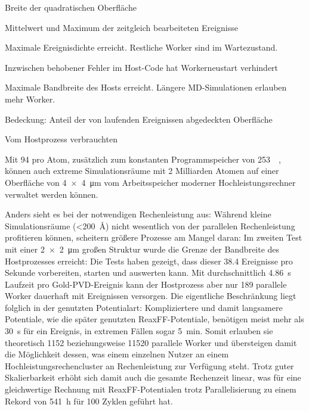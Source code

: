 \begin{table}
\begin{threeparttable}
    \begin{tablenotes}
    \item[2] Breite der quadratischen Oberfläche
    \item[a] Mittelwert und Maximum der zeitgleich bearbeiteten Ereignisse
    \item[b] Maximale Ereignisdichte erreicht.
      Restliche Worker sind im Wartezustand.
    \item[c] Inzwischen behobener Fehler im Host-Code hat Workerneustart verhindert
    \item[d] Maximale Bandbreite des Hosts erreicht.
      Längere MD-Simulationen erlauben mehr Worker.
    \item[e] Bedeckung: Anteil der von laufenden Ereignissen abgedeckten Oberfläche
    \item[f] Vom Hostprozess verbrauchten
    \end{tablenotes}

\end{threeparttable}\end{table}

Mit \SI{94}{\byte} pro Atom, zusätzlich zum konstanten Programmspeicher von \SI{253}{\mebi\byte}, können auch extreme Simulationsräume mit 2 Milliarden Atomen auf einer Oberfläche von \SI{4x4}{\micro\meter} vom Arbeitsspeicher moderner Hochleistungsrechner verwaltet werden können.

Anders sieht es bei der notwendigen Rechenleistung aus:
Während kleine Simulationsräume (\SI{<200}{\angstrom}) nicht wesentlich von der parallelen Rechenleistung profitieren können, scheitern größere Prozesse am Mangel daran:
Im zweiten Test mit einer \SI{2x2}{\micro\meter} großen Struktur wurde die Grenze der Bandbreite des Hostprozesses erreicht:
Die Tests haben gezeigt, dass dieser \num{38.4} Ereignisse pro Sekunde vorbereiten, starten und auswerten kann.
Mit durchschnittlich \SI{4.86}{\second} Laufzeit pro Gold-PVD-Ereignis kann der Hostprozess aber nur 189 parallele Worker dauerhaft mit Ereignissen versorgen.
Die eigentliche Beschränkung liegt folglich in der genutzten Potentialart:
Kompliziertere und damit langsamere Potentiale, wie die später genutzten ReaxFF-Potentiale, benötigen meist mehr als \SI{30}{\second} für ein Ereignis, in extremen Fällen sogar \SI{5}{\minute}.
Somit erlauben sie theoretisch \num{1152} beziehungsweise \num{11520} parallele Worker und übersteigen damit die Möglichkeit dessen, was einem einzelnen Nutzer an einem Hochleistungsrechencluster an Rechenleistung zur Verfügung steht.
Trotz guter Skalierbarkeit erhöht sich damit auch die gesamte Rechenzeit linear, was für eine gleichwertige Rechnung mit ReaxFF-Potentialen trotz Parallelisierung zu einem Rekord von \SI{541}{\hour} für 100 Zyklen geführt hat.

